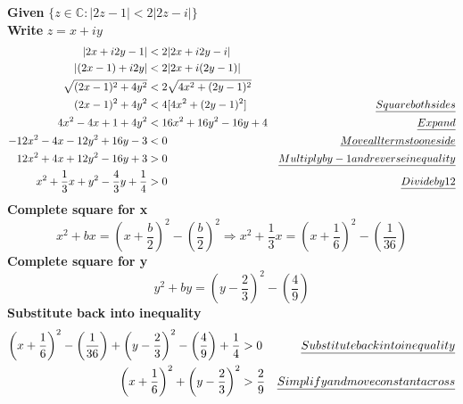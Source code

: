 \documentclass[a4paper, 8pt]{extarticle}
\begin{document}
\begin{examplebox}[2022 Q1(a), 2021 Q1(d), 2017 Q1(a), 2016 Q1(a)]
	\label{sol:2022Q1a}
	\textbf{Given} $\{ z \in \mathbb{C} : |2z - 1| < 2|2z-i|\}$ \\
	\textbf{Write} $z = x + iy$
	\begin{align*}
		|2x + i2y -1 |                                        & < 2 |2x + i2y - i|                                                        \\
		|(2x -1) + i2y|                                       & < 2 |2x + i(2y -1)|                                                       \\
		\sqrt{(2x-1)^2 + 4y^2}                                & < 2 \sqrt{4x^2 + (2y-1)^2}                                                \\
		(2x-1)^2 + 4y^2                                       & < 4[4x^2 + (2y-1)^2]       & \emph{Square both sides}                     \\
		4x^2 - 4x + 1 + 4y^2                                  & < 16x^2 + 16y^2 -16y +4    & \emph{Expand}                                \\
		-12x^2 - 4x - 12y^2 + 16y -3                          & < 0                        & \emph{Move all terms to one side}            \\
		12x^2 + 4x + 12y^2 - 16y + 3                          & > 0                        & \emph{Multiply by -1 and reverse inequality} \\
		x^2 + \frac{1}{3}x + y^2 - \frac{4}{3}y + \frac{1}{4} & > 0                        & \emph{Divide by 12}                          \\
	\end{align*}
	\textbf{Complete square for x}
	$$x^2 + bx = \left(x + \frac{b}{2}\right)^2 - \left(\frac{b}{2}\right)^2 \Rightarrow x^2 + \frac{1}{3}x = \left(x + \frac{1}{6}\right)^2 - \left(\frac{1}{36}\right)$$
	\textbf{Complete square for y}
	$$y^2 + by = \left(y - \frac{2}{3}\right)^2 - \left(\frac{4}{9}\right)$$
	\textbf{Substitute back into inequality}
	\begin{align*}
		\left(x + \frac{1}{6}\right)^2 - \left(\frac{1}{36}\right) + \left(y - \frac{2}{3}\right)^2 - \left(\frac{4}{9}\right)  + \frac{1}{4} & > 0            & \emph{Substitute back into inequality}   \\
		\left(x + \frac{1}{6}\right)^2 + \left(y - \frac{2}{3}\right)^2                                                                       & >  \frac{2}{9} & \emph{Simplify and move constant across} \\
	\end{align*}


\end{examplebox}
\end{document}

